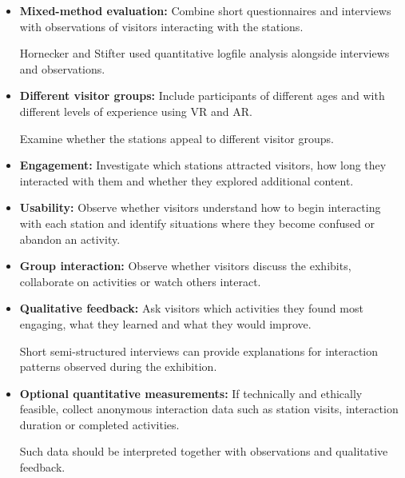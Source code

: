 \begin{itemize}

    \item \textbf{Mixed-method evaluation:}
    Combine short questionnaires and interviews with
    observations of visitors interacting with the stations.

    Hornecker and Stifter used quantitative logfile
    analysis alongside interviews and observations.
    \cite[p.~137]{hornecker_learning_2006}

    \item \textbf{Different visitor groups:}
    Include participants of different ages and with
    different levels of experience using VR and AR.

    Examine whether the stations appeal to different
    visitor groups.
    \cite[pp.~137--139]{hornecker_learning_2006}

    \item \textbf{Engagement:}
    Investigate which stations attracted visitors,
    how long they interacted with them and whether
    they explored additional content.
    \cite[pp.~137--138]{hornecker_learning_2006}

    \item \textbf{Usability:}
    Observe whether visitors understand how to begin
    interacting with each station and identify situations
    where they become confused or abandon an activity.
    \cite[pp.~138--139]{hornecker_learning_2006}

    \item \textbf{Group interaction:}
    Observe whether visitors discuss the exhibits,
    collaborate on activities or watch others interact.
    \cite[pp.~140--142]{hornecker_learning_2006}

    \item \textbf{Qualitative feedback:}
    Ask visitors which activities they found most engaging,
    what they learned and what they would improve.

    Short semi-structured interviews can provide explanations
    for interaction patterns observed during the exhibition.
    \cite[p.~137]{hornecker_learning_2006}

    \item \textbf{Optional quantitative measurements:}
    If technically and ethically feasible, collect anonymous
    interaction data such as station visits, interaction
    duration or completed activities.

    Such data should be interpreted together with
    observations and qualitative feedback.
    \cite[pp.~137--138]{hornecker_learning_2006}


\end{itemize}
